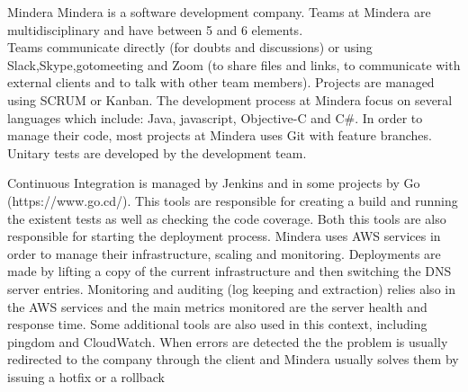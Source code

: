     \begin{companyreport}{Mindera}
      \product
      Mindera is a software development company.
      \teams
      Teams at Mindera are multidisciplinary and have between 5 and 6 elements. \\
      Teams communicate  directly (for doubts and discussions) or using Slack,Skype,gotomeeting and Zoom (to share files and links, to communicate with external clients and to talk with other team members).
      Projects are managed using SCRUM or Kanban.
      \development
      The development process at Mindera focus on several languages which include: Java, javascript, Objective-C and C\#. In order to manage their code, most projects at Mindera uses Git with feature branches.
      Unitary tests are developed by the development team.

      Continuous Integration is managed by Jenkins and in some projects by Go (https://www.go.cd/). This tools are responsible for creating a build and running the existent tests as well as checking the code coverage. Both this tools are also responsible for starting the deployment process.
      \operations
      Mindera uses AWS services in order to manage their infrastructure, scaling and monitoring.
      Deployments are made by lifting a copy of the current infrastructure and then switching the DNS server entries.
      Monitoring and auditing (log keeping and extraction) relies also in the AWS services and the main metrics monitored are the server health and response time. Some additional tools are also used in this context, including pingdom and CloudWatch.
      When errors are detected the the problem is usually redirected to the company through the client and Mindera usually solves them by issuing a hotfix or a rollback
      \reportend
    \end{companyreport}
